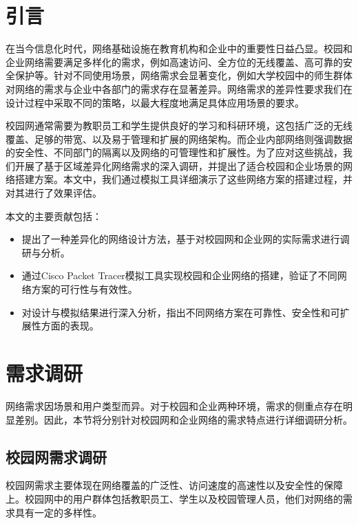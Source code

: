 \documentclass[12pt]{article}
\begin{document}


\begin{abstract}
本论文旨在通过调研不同区域的网络需求，模拟校园网和企业内部网络的搭建过程。现代社会中，网络的可靠性、灵活性和可扩展性在校园和企业环境中变得至关重要。然而，不同区域的网络需求差异使得网络设计面临诸多挑战。本研究通过深入调研和需求分析，设计并模拟了适应不同场景的网络架构方案。通过使用Cisco Packet Tracer进行网络模拟，我们验证了各类网络方案在不同需求下的可行性和有效性，为校园网和企业网络的未来部署提供了参考依据。
\end{abstract}

\section{引言}
在当今信息化时代，网络基础设施在教育机构和企业中的重要性日益凸显。校园和企业网络需要满足多样化的需求，例如高速访问、全方位的无线覆盖、高可靠的安全保护等。针对不同使用场景，网络需求会显著变化，例如大学校园中的师生群体对网络的需求与企业中各部门的需求存在显著差异。网络需求的差异性要求我们在设计过程中采取不同的策略，以最大程度地满足具体应用场景的要求。

校园网通常需要为教职员工和学生提供良好的学习和科研环境，这包括广泛的无线覆盖、足够的带宽、以及易于管理和扩展的网络架构。而企业内部网络则强调数据的安全性、不同部门的隔离以及网络的可管理性和扩展性。为了应对这些挑战，我们开展了基于区域差异化网络需求的深入调研，并提出了适合校园和企业场景的网络搭建方案。本文中，我们通过模拟工具详细演示了这些网络方案的搭建过程，并对其进行了效果评估。

本文的主要贡献包括：
\begin{itemize}
    \item 提出了一种差异化的网络设计方法，基于对校园网和企业网的实际需求进行调研与分析。
    \item 通过Cisco Packet Tracer模拟工具实现校园和企业网络的搭建，验证了不同网络方案的可行性与有效性。
    \item 对设计与模拟结果进行深入分析，指出不同网络方案在可靠性、安全性和可扩展性方面的表现。
\end{itemize}

\section{需求调研}
网络需求因场景和用户类型而异。对于校园和企业两种环境，需求的侧重点存在明显差别。因此，本节将分别针对校园网和企业网络的需求特点进行详细调研分析。

\subsection{校园网需求调研}
校园网需求主要体现在网络覆盖的广泛性、访问速度的高速性以及安全性的保障上。校园网中的用户群体包括教职员工、学生以及校园管理人员，他们对网络的需求具有一定的多样性。
\end{document}

